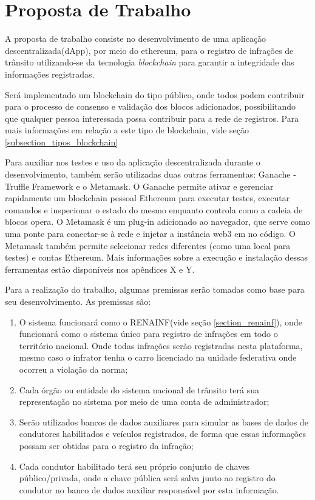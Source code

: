 \chapter[Proposta de Trabalho]{Proposta de Trabalho}


A proposta de trabalho consiste no desenvolvimento de uma aplicação descentralizada(dApp), por meio do ethereum, para o registro de infrações de trânsito utilizando-se da tecnologia \textit{blockchain} para garantir a integridade das informações registradas. 

Será implementado um blockchain do tipo público, onde todos podem contribuir para o processo de consenso e validação dos blocos adicionados, possibilitando que qualquer pessoa interessada possa contribuir para a rede de registros. Para mais informações em relação a este tipo de blockchain, vide seção \ref{subsection_tipos_blockchain}

Para auxiliar nos testes e uso da aplicação descentralizada durante o desenvolvimento, também serão utilizadas duas outras ferramentas: Ganache - Truffle Framework e o Metamask. O Ganache permite ativar e gerenciar rapidamente um blockchain pessoal Ethereum para executar testes, executar comandos e inspecionar o estado do mesmo enquanto controla como a cadeia de blocos opera. O Metamask é um plug-in adicionado ao navegador, que serve como uma ponte para conectar-se à rede e injetar a instância web3 em no código. O Metamask também permite selecionar redes diferentes (como uma local para testes) e contas Ethereum.
Mais informações sobre a execução e instalação dessas ferramentas estão disponíveis nos apêndices X e Y.

Para a realização do trabalho, algumas premissas serão tomadas como base para seu desenvolvimento. As premissas são:

    \begin{enumerate}
        \item O sistema funcionará como o RENAINF(vide seção \ref{section_renainf}), onde funcionará como o sistema único para registro de infrações em todo o território nacional. Onde todas infrações serão registradas nesta plataforma, mesmo caso o infrator tenha o carro licenciado na unidade federativa onde ocorreu a violação da norma;
        \item Cada órgão ou entidade do sistema nacional de trânsito terá sua representação no sistema por meio de uma conta de administrador;
        \item Serão utilizados bancos de dados auxiliares para simular as bases de dados de condutores habilitados e veículos registrados, de forma que essas informações possam ser obtidas para o registro da infração;
        \item Cada condutor habilitado terá seu próprio conjunto de chaves público/privada, onde a chave pública será salva junto ao registro do condutor no banco de dados auxiliar responsável por esta informação.
    \end{enumerate}


